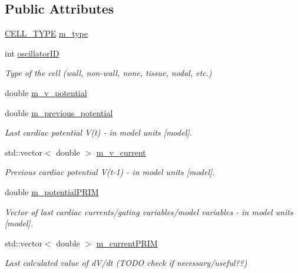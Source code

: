\subsection*{Public Attributes}
\begin{DoxyCompactItemize}
\item 
\hyperlink{heart_defines_8h_a2f059cd81f362503874790462d535f5b}{C\+E\+L\+L\+\_\+\+T\+Y\+P\+E} \hyperlink{class_oscillator_a7553dcea69896c2f3ff2bc8bda1d05cc}{m\+\_\+type}
\item 
int \hyperlink{class_oscillator_acfc962cfc0b6c92fc8ae8d7254346bef}{oscillator\+I\+D}
\begin{DoxyCompactList}\small\item\em Type of the cell (wall, non-\/wall, none, tissue, nodal, etc.) \end{DoxyCompactList}\item 
double \hyperlink{class_oscillator_a44d11f6d153d4a061fc1bbb6785ddc18}{m\+\_\+v\+\_\+potential}
\item 
double \hyperlink{class_oscillator_a2a1649ababe43b1de3dbd6d5f24db703}{m\+\_\+previous\+\_\+potential}
\begin{DoxyCompactList}\small\item\em Last cardiac potential V(t) -\/ in model units \mbox{[}model\mbox{]}. \end{DoxyCompactList}\item 
std\+::vector$<$ double $>$ \hyperlink{class_oscillator_a344928736ed0deb40bc1c73d50af5d33}{m\+\_\+v\+\_\+current}
\begin{DoxyCompactList}\small\item\em Previous cardiac potential V(t-\/1) -\/ in model units \mbox{[}model\mbox{]}. \end{DoxyCompactList}\item 
double \hyperlink{class_oscillator_aedf0974c19ea8428e3702f267cf45465}{m\+\_\+potential\+P\+R\+I\+M}
\begin{DoxyCompactList}\small\item\em Vector of last cardiac currents/gating variables/model variables -\/ in model units \mbox{[}model\mbox{]}. \end{DoxyCompactList}\item 
std\+::vector$<$ double $>$ \hyperlink{class_oscillator_aef644a4e5faf78fa338a7a5e739f267c}{m\+\_\+current\+P\+R\+I\+M}
\begin{DoxyCompactList}\small\item\em Last calculated value of d\+V/dt (T\+O\+D\+O check if necessary/useful??) \end{DoxyCompactList}\item 

\end{DoxyCompactItemize}
